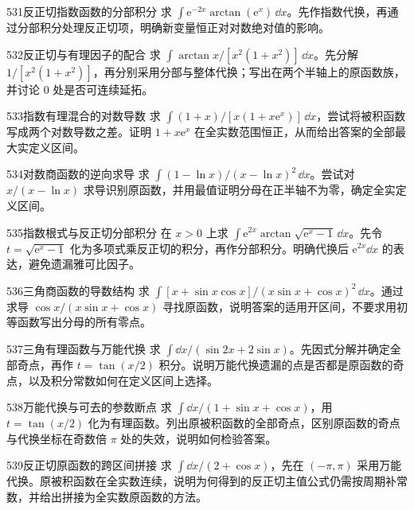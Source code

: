 \begin{exercise}{531}{反正切指数函数的分部积分}
求 $\int\mathrm e^{-2x}\arctan(\mathrm e^x)\,\dd x$。先作指数代换，再通过分部积分处理反正切项，明确新变量恒正对对数绝对值的影响。
\end{exercise}
\begin{exercise}{532}{反正切与有理因子的配合}
求 $\int\arctan x/[x^2(1+x^2)]\,\dd x$。先分解 $1/[x^2(1+x^2)]$，再分别采用分部与整体代换；写出在两个半轴上的原函数族，并讨论 $0$ 处是否可连续延拓。
\end{exercise}
\begin{exercise}{533}{指数有理混合的对数导数}
求 $\int(1+x)/[x(1+x\mathrm e^x)]\,\dd x$，尝试将被积函数写成两个对数导数之差。证明 $1+x\mathrm e^x$ 在全实数范围恒正，从而给出答案的全部最大实定义区间。
\end{exercise}
\begin{exercise}{534}{对数商函数的逆向求导}
求 $\int(1-\ln x)/(x-\ln x)^2\,\dd x$。尝试对 $x/(x-\ln x)$ 求导识别原函数，并用最值证明分母在正半轴不为零，确定全实定义区间。
\end{exercise}
\begin{exercise}{535}{指数根式与反正切分部积分}
在 $x>0$ 上求 $\int\mathrm e^{2x}\arctan\sqrt{\mathrm e^x-1}\,\dd x$。先令 $t=\sqrt{\mathrm e^x-1}$ 化为多项式乘反正切的积分，再作分部积分。明确代换后 $\mathrm e^{2x}\dd x$ 的表达，避免遗漏雅可比因子。
\end{exercise}
\begin{exercise}{536}{三角商函数的导数结构}
求 $\int[x+\sin x\cos x]/(x\sin x+\cos x)^2\,\dd x$。通过求导 $\cos x/(x\sin x+\cos x)$ 寻找原函数，说明答案的适用开区间，不要求用初等函数写出分母的所有零点。
\end{exercise}
\begin{exercise}{537}{三角有理函数与万能代换}
求 $\int\dd x/(\sin2x+2\sin x)$。先因式分解并确定全部奇点，再作 $t=\tan(x/2)$ 积分。说明万能代换遗漏的点是否都是原函数的奇点，以及积分常数如何在定义区间上选择。
\end{exercise}
\begin{exercise}{538}{万能代换与可去的参数断点}
求 $\int\dd x/(1+\sin x+\cos x)$，用 $t=\tan(x/2)$ 化为有理函数。列出原被积函数的全部奇点，区别原函数的奇点与代换坐标在奇数倍 $\pi$ 处的失效，说明如何检验答案。
\end{exercise}
\begin{exercise}{539}{反正切原函数的跨区间拼接}
求 $\int\dd x/(2+\cos x)$，先在 $(-\pi,\pi)$ 采用万能代换。原被积函数在全实数连续，说明为何得到的反正切主值公式仍需按周期补常数，并给出拼接为全实数原函数的方法。
\end{exercise}
